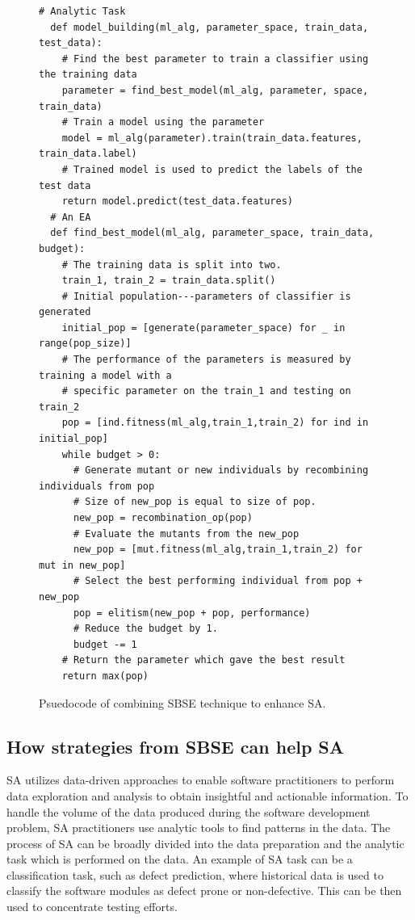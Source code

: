 \documentclass[table, xcdraw, sigconf,review, anonymous]{acmart}
\begin{document}
\begin{figure}[t]
\small
\hspace{0.4cm}
\begin{lstlisting}[xrightmargin=5.0ex,mathescape,frame=none,numbers=right,linebackgroundcolor={%
        \ifnum\value{lstnumber}>9
            \ifnum\value{lstnumber}<30
                \color{gray!25}
            \fi
        \fi},autogobble=true,]
  # Analytic Task
  def model_building(ml_alg, parameter_space, train_data, test_data):
    # Find the best parameter to train a classifier using the training data
    parameter = find_best_model(ml_alg, parameter, space, train_data)
    # Train a model using the parameter 
    model = ml_alg(parameter).train(train_data.features, train_data.label)
    # Trained model is used to predict the labels of the test data
    return model.predict(test_data.features)
  # An EA
  def find_best_model(ml_alg, parameter_space, train_data, budget):
    # The training data is split into two. 
    train_1, train_2 = train_data.split()
    # Initial population---parameters of classifier is generated
    initial_pop = [generate(parameter_space) for _ in range(pop_size)]
    # The performance of the parameters is measured by training a model with a 
    # specific parameter on the train_1 and testing on train_2
    pop = [ind.fitness(ml_alg,train_1,train_2) for ind in initial_pop]
    while budget > 0:
      # Generate mutant or new individuals by recombining individuals from pop
      # Size of new_pop is equal to size of pop.
      new_pop = recombination_op(pop)
      # Evaluate the mutants from the new_pop
      new_pop = [mut.fitness(ml_alg,train_1,train_2) for mut in new_pop]
      # Select the best performing individual from pop + new_pop
      pop = elitism(new_pop + pop, performance)
      # Reduce the budget by 1. 
      budget -= 1
    # Return the parameter which gave the best result
    return max(pop)

\end{lstlisting}
\caption{\small{Psuedocode of combining SBSE technique to enhance SA.}
}
\label{fig:EASA}  
\end{figure}


\subsection{How strategies from SBSE can help SA}

SA utilizes data-driven approaches to enable software practitioners to perform data exploration and analysis to obtain insightful and actionable information. To handle the volume of the data produced during the software development problem, SA practitioners use analytic tools to find patterns in the data. The process of SA can be broadly divided into the data preparation and the analytic task which is performed on the data. An example of SA task can be a classification task, such as defect prediction, where historical data is used to classify the software modules as defect prone or non-defective. This can be then used to concentrate testing efforts. 
\end{document}
